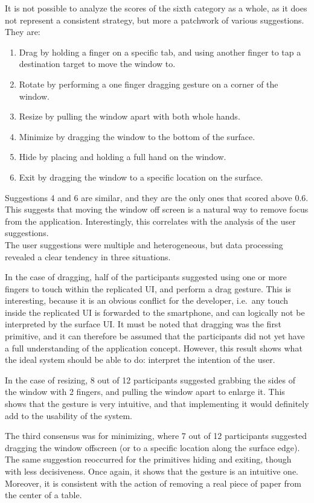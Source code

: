 It is not possible to analyze the scores of the sixth category as a whole, as it does not represent a consistent strategy, but more a patchwork of various suggestions. They are:
\begin{enumerate}
\item Drag by holding a finger on a specific tab, and using another finger to tap a destination target to move the window to.
\item Rotate by performing a one finger dragging gesture on a corner of the window.
\item Resize by pulling the window apart with both whole hands.
\item Minimize by dragging the window to the bottom of the surface.
\item Hide by placing and holding a full hand on the window.
\item Exit by dragging the window to a specific location on the surface.
\end{enumerate}
Suggestions 4 and 6 are similar, and they are the only ones that scored above 0.6.
This suggests that moving the window off screen is a natural way to remove focus from the application.
Interestingly, this correlates with the analysis of the user suggestions.
\\
\linebreak
The user suggestions were multiple and heterogeneous, but data processing revealed a clear tendency in three situations.

In the case of dragging, half of the participants suggested using one or more fingers to touch within the replicated UI, and perform a drag gesture.
This is interesting, because it is an obvious conflict for the developer, i.e.\ any touch inside the replicated UI is forwarded to the smartphone, and can logically not be interpreted by the surface UI.
It must be noted that dragging was the first primitive, and it can therefore be assumed that the participants did not yet have a full understanding of the application concept.
However, this result shows what the ideal system should be able to do: interpret the intention of the user.

In the case of resizing, 8 out of 12 participants suggested grabbing the sides of the window with 2 fingers, and pulling the window apart to enlarge it.
This shows that the gesture is very intuitive, and that implementing it would definitely add to the usability of the system.

The third consensus was for minimizing, where 7 out of 12 participants suggested dragging the window offscreen (or to a specific location along the surface edge).
The same suggestion reoccurred for the primitives hiding and exiting, though with less decisiveness.
Once again, it shows that the gesture is an intuitive one.
Moreover, it is consistent with the action of removing a real piece of paper from the center of a table.

